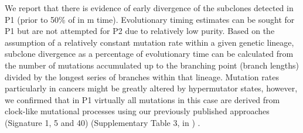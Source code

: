 We report that there is evidence of early divergence of the subclones detected in P1 (prior to 50\% of in m time). Evolutionary timing estimates can be sought for P1 but are not attempted for P2 due to relatively low purity.  Based on the assumption of a relatively constant mutation rate within a given genetic lineage, subclone divergence as a percentage of evolutionary time can be calculated from the number of mutations accumulated up to the branching point (branch lengths) divided by the longest series of branches within that lineage. Mutation rates particularly in cancers might be greatly altered by hypermutator states, however, we confirmed that in P1 virtually all mutations in this case are derived from clock-like mutational processes using our previously published approaches (Signature 1, 5 and 40) (Supplementary Table 3, in \textcite{Lomakin2022-ks}) \parencite{Nik-Zainal2016-ek}. 